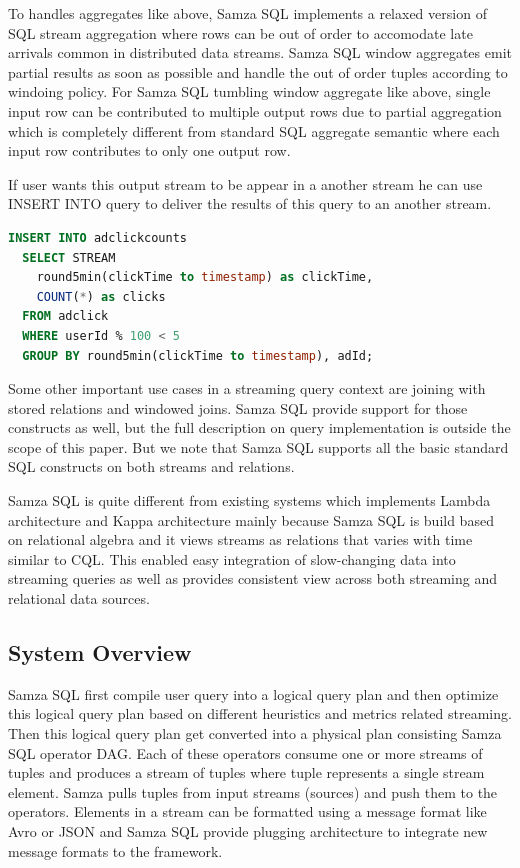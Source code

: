 \documentclass[10pt, conference, compsocconf]{IEEEtran}
\begin{document}
To handles aggregates like above, Samza SQL implements a relaxed version of SQL stream aggregation where rows can be out of order to accomodate late arrivals common in distributed data streams. Samza SQL window aggregates emit partial results as soon as possible and handle the out of order tuples according to windoing policy. For Samza SQL tumbling window aggregate like above, single input row can be contributed to multiple output rows due to partial aggregation which is completely different from standard SQL aggregate semantic where each input row contributes to only one output row.

If user wants this output stream to be appear in a another stream he can use INSERT INTO query to deliver the results of this query to an another stream.

\begin{lstlisting}[language=SQL]
INSERT INTO adclickcounts
  SELECT STREAM 
    round5min(clickTime to timestamp) as clickTime,
    COUNT(*) as clicks
  FROM adclick
  WHERE userId % 100 < 5
  GROUP BY round5min(clickTime to timestamp), adId;
\end{lstlisting}

Some other important use cases in a streaming query context are joining with stored relations and windowed joins. Samza SQL provide support for those constructs as well, but the full description on query implementation is outside the scope of this paper. But we note that Samza SQL supports all the basic standard SQL constructs on both streams and relations.

Samza SQL is quite different from existing systems which implements Lambda architecture and Kappa architecture mainly because Samza SQL is build based on relational algebra and it views streams as relations that varies with time similar to CQL. This enabled easy integration of slow-changing data into streaming queries as well as provides consistent view across both streaming and relational data sources.

\subsection{System Overview}

Samza SQL first compile user query into a logical query plan and then optimize this logical query plan based on different heuristics and metrics related streaming. Then this logical query plan get converted into a physical plan consisting Samza SQL operator DAG. Each of these operators consume one or more streams of tuples and produces a stream of tuples where tuple represents a single stream element. Samza pulls tuples from input streams (sources) and push them to the operators. Elements in a stream can be formatted using a message format like Avro or JSON and Samza SQL provide plugging architecture to integrate new message formats to the framework. 
\end{document}
